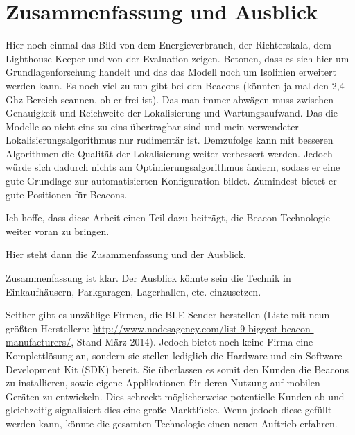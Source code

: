 \chapter{Zusammenfassung und Ausblick}

Hier noch einmal das Bild von dem Energieverbrauch, der Richterskala, dem Lighthouse Keeper und von der Evaluation zeigen. Betonen, dass es sich hier um Grundlagenforschung handelt und das das Modell noch um Isolinien erweitert werden kann. Es noch viel zu tun gibt bei den Beacons (könnten ja mal den 2,4 Ghz Bereich scannen, ob er frei ist). Das man immer abwägen muss zwischen Genauigkeit und Reichweite der Lokalisierung und Wartungsaufwand. Das die Modelle so nicht eins zu eins übertragbar sind und mein verwendeter Lokalisierungsalgorithmus nur rudimentär ist. Demzufolge kann mit besseren Algorithmen die Qualität der Lokalisierung weiter verbessert werden. Jedoch würde sich dadurch nichts am Optimierungsalgorithmus ändern, sodass er eine gute Grundlage zur automatisierten Konfiguration bildet. Zumindest bietet er gute Positionen für Beacons. 

Ich hoffe, dass diese Arbeit einen Teil dazu beiträgt, die Beacon-Technologie weiter voran zu bringen. 




Hier steht dann die Zusammenfassung und der Ausblick.


Zusammenfassung ist klar. Der Ausblick könnte sein die Technik in Einkaufhäusern, Parkgaragen, Lagerhallen, etc. einzusetzen. 

Seither gibt es unzählige Firmen, die BLE-Sender herstellen (Liste mit neun größten Herstellern: \url{http://www.nodesagency.com/list-9-biggest-beacon-manufacturers/}, Stand März 2014). Jedoch bietet noch keine Firma eine Komplettlösung an, sondern sie stellen lediglich die Hardware und ein Software Development Kit (SDK) bereit. Sie überlassen es somit den Kunden die Beacons zu installieren, sowie eigene Applikationen für deren Nutzung auf mobilen Geräten zu entwickeln. Dies schreckt möglicherweise potentielle Kunden ab und gleichzeitig signalisiert dies eine große Marktlücke. Wenn jedoch diese gefüllt werden kann, könnte die gesamten Technologie einen neuen Auftrieb erfahren.